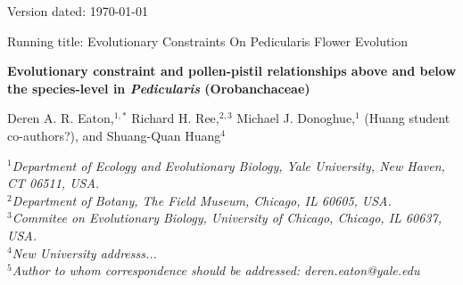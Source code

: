 \documentclass[12pt,letterpaper]{article}
\begin{document}
\begin{flushright}
Version dated: \today
\end{flushright}
\bigskip

\noindent Running title: Evolutionary Constraints On Pedicularis Flower Evolution \\

\begin{center}

{\Large \textbf{Evolutionary constraint and pollen-pistil 
relationships above and below the species-level in \emph{Pedicularis} (Orobanchaceae)}

\bigskip
\medskip

{\large Deren A. R. Eaton,$^{1,*}$
  Richard H. Ree,$^{2,3}$
  Michael J. Donoghue,$^{1}$
  (Huang student co-authors?), and 
  Shuang-Quan Huang$^{4}$}}

\medskip
\end{center}

{\it \small
\noindent 
$^1$Department of Ecology and Evolutionary Biology, Yale University, New Haven, CT 06511, USA. \\
\noindent $^2$Department of Botany, The Field Museum, Chicago, IL 60605, USA. \\
\noindent $^3$Commitee on Evolutionary Biology, University of Chicago, Chicago, IL 60637, USA. \\
\noindent $^4$New University addresss... \\
\noindent $^5$Author to whom correspondence should be addressed: deren.eaton@yale.edu \\  }

\bigskip
\end{document}
